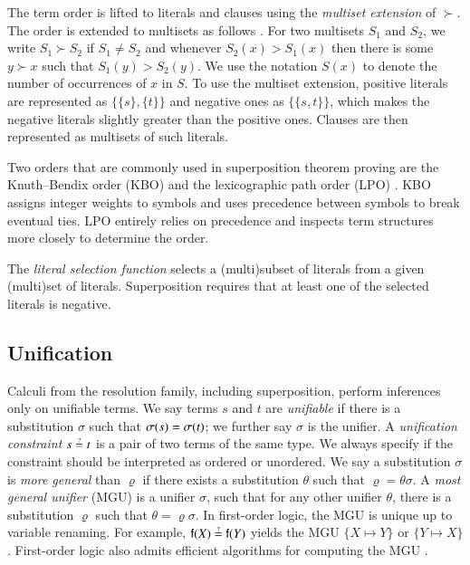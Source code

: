 The term order is lifted to literals and clauses using the {\em multiset extension} of
$\succ$. The order is extended to multisets as follows
\cite[Sect.~2.5]{bg-01-resolution}. For two multisets $S_1$ and $S_2$, we write $S_1 \succ S_2$ if $S_1 \not= S_2$
and whenever $S_2(x) > S_1(x)$ then there is some $y \succ x$ such that $S_1(y)
> S_2(y)$. We use the notation $S(x)$ to denote the number of occurrences of $x$ in
$S$. To use the  multiset extension, positive literals are represented as $ \{ \{s\},
\{t\} \}$ and negative ones as $\{ \{ s, t \} \}$, which makes the negative literals slightly greater than the positive ones.
Clauses are then represented as 
multisets of such literals. 

Two orders that are commonly used in superposition theorem proving are the
Knuth--Bendix order (KBO) \cite[Sect.~5.4.4]{bn-98-tr-and-all-that} and the
lexicographic path order (LPO) \cite[Sect.~5.4.2]{bn-98-tr-and-all-that}.
KBO assigns integer weights to symbols and uses precedence between symbols to
break eventual ties. LPO entirely relies on precedence and inspects term
structures more closely to determine the order. 

\newcommand{\selfun}{\ensuremath{\mathit{Sel}}}
The {\em literal selection function} selects a (multi)subset of literals
from a given (multi)set of literals. Superposition requires that at least one of the selected literals is negative.
\pagebreak[2] 

\subsection{Unification}
\label{sec:pre:unif}

Calculi from the resolution family, including superposition, perform inferences
only on unifiable terms. We say terms $s$ and $t$ are {\em unifiable} if there is a
substitution $\sigma$ such that $\sigma(s) = \sigma(t)$; we further say
$\sigma$ is the unifier. A \emph{unification constraint} $s \unif t$ is a pair of two terms of the same type. 
We always specify if the constraint should be interpreted as ordered or unordered.
We say a substitution $\sigma$ is \emph{more general} than $\varrho$ if there exists a substitution $\theta$
such that $\varrho = \theta\sigma$.
A \emph{most general unifier} ({MGU}) is a
unifier $\sigma$, such that for any other unifier $\theta$, there is a
substitution $\varrho$ such that $\theta = \varrho\sigma$. In first-order logic,
the MGU is unique up to variable renaming. For example, $\cst{f}(X) \unif \cst{f}(Y)$ yields the MGU 
$\{ X \mapsto Y\}$ or  $\{ Y \mapsto X \}$. First-order logic also admits efficient algorithms for computing the MGU \cite{hv-09-unifalgs}.

